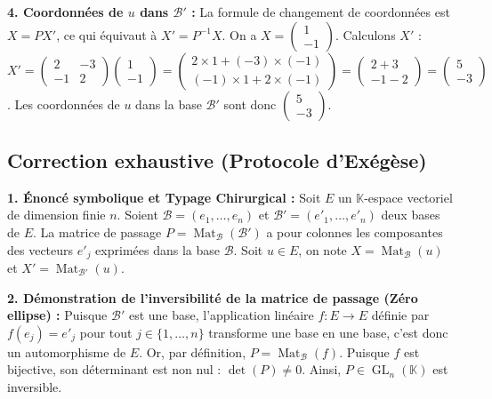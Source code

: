 \documentclass{report}
\begin{document}
\textbf{4. Coordonnées de $u$ dans $\mathcal{B}'$ :}
La formule de changement de coordonnées est $X = P X'$, ce qui équivaut à $X' = P^{-1} X$.
On a $X = \begin{pmatrix} 1 \\ -1 \end{pmatrix}$.
Calculons $X'$ :
$X' = \begin{pmatrix} 2 & -3 \\ -1 & 2 \end{pmatrix} \begin{pmatrix} 1 \\ -1 \end{pmatrix} = \begin{pmatrix} 2 \times 1 + (-3) \times (-1) \\ (-1) \times 1 + 2 \times (-1) \end{pmatrix} = \begin{pmatrix} 2 + 3 \\ -1 - 2 \end{pmatrix} = \begin{pmatrix} 5 \\ -3 \end{pmatrix}$.
Les coordonnées de $u$ dans la base $\mathcal{B}'$ sont donc $\begin{pmatrix} 5 \\ -3 \end{pmatrix}$.







\subsection*{Correction exhaustive (Protocole d'Exégèse)}

\textbf{1. Énoncé symbolique et Typage Chirurgical :}
Soit $E$ un $\mathbb{K}$-espace vectoriel de dimension finie $n$. Soient $\mathcal{B} = (e_1, \dots, e_n)$ et $\mathcal{B}' = (e'_1, \dots, e'_n)$ deux bases de $E$.
La matrice de passage $P = \operatorname{Mat}_{\mathcal{B}}(\mathcal{B}')$ a pour colonnes les composantes des vecteurs $e'_j$ exprimées dans la base $\mathcal{B}$.
Soit $u \in E$, on note $X = \operatorname{Mat}_{\mathcal{B}}(u)$ et $X' = \operatorname{Mat}_{\mathcal{B}'}(u)$.

\textbf{2. Démonstration de l'inversibilité de la matrice de passage (Zéro ellipse) :}
Puisque $\mathcal{B}'$ est une base, l'application linéaire $f : E \to E$ définie par $f(e_j) = e'_j$ pour tout $j \in \{1, \dots, n\}$ transforme une base en une base, c'est donc un automorphisme de $E$.
Or, par définition, $P = \operatorname{Mat}_{\mathcal{B}}(f)$.
Puisque $f$ est bijective, son déterminant est non nul : $\det(P) \neq 0$.
Ainsi, $P \in \operatorname{GL}_n(\mathbb{K})$ est inversible.
\end{document}
